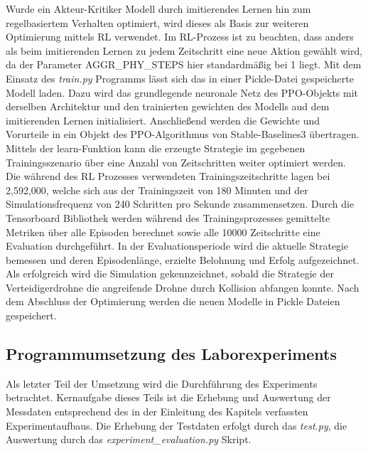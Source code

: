 Wurde ein Akteur-Kritiker Modell durch imitierendes Lernen hin zum regelbasiertem Verhalten optimiert, wird dieses als Basis zur weiteren Optimierung mittels RL verwendet.
Im RL-Prozess ist zu beachten, dass anders als beim imitierenden Lernen zu jedem Zeitschritt eine neue Aktion gewählt wird, da der Parameter AGGR\_PHY\_STEPS hier standardmäßig bei 1 liegt.
Mit dem Einsatz des \textit{train.py} Programms lässt sich das in einer Pickle-Datei gespeicherte Modell laden.
Dazu wird das grundlegende neuronale Netz des PPO-Objekts  mit derselben Architektur und den trainierten gewichten des Modells aud dem imitierenden Lernen initialisiert.
Anschließend werden die Gewichte und Vorurteile in ein Objekt des PPO-Algorithmus von Stable-Baselines3 übertragen.
Mittels der learn-Funktion kann die erzeugte Strategie im gegebenen Trainingsszenario über eine Anzahl von Zeitschritten weiter optimiert werden.
Die während des RL Prozesses verwendeten Trainingszeitschritte lagen bei 2,592,000, welche sich aus der Trainingszeit von 180 Minuten und der Simulationsfrequenz von 240 Schritten pro Sekunde zusammensetzen.
Durch die Tensorboard Bibliothek werden während des Trainingsprozesses gemittelte Metriken über alle Episoden berechnet sowie alle 10000 Zeitschritte eine Evaluation durchgeführt.
In der Evaluationsperiode wird die aktuelle Strategie bemessen und deren Episodenlänge, erzielte Belohnung und Erfolg aufgezeichnet.
Als erfolgreich wird die Simulation gekennzeichnet, sobald die Strategie der Verteidigerdrohne die angreifende Drohne durch Kollision abfangen konnte.
Nach dem Abschluss der Optimierung werden die neuen Modelle in Pickle Dateien gespeichert. 

\subsection{Programmumsetzung des Laborexperiments}

Als letzter Teil der Umsetzung wird die Durchführung des Experiments betrachtet.
Kernaufgabe dieses Teils ist die Erhebung und Auswertung der Messdaten entsprechend des in der Einleitung des Kapitels verfassten Experimentaufbaus.
Die Erhebung der Testdaten erfolgt durch das \textit{test.py}, die Auswertung durch das \textit{experiment\_evaluation.py} Skript.

